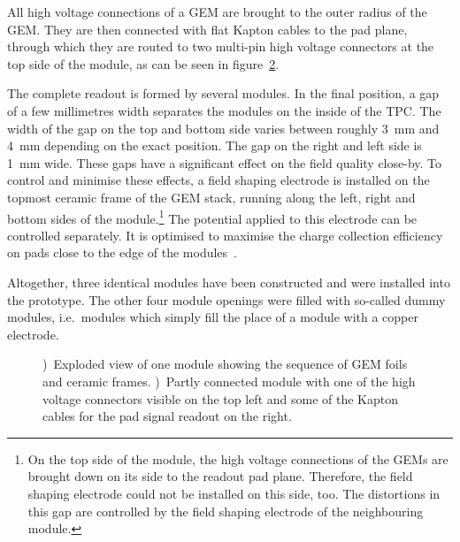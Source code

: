 \documentclass[preprint]{elsarticle}
\begin{document}
All high voltage connections of a GEM are brought to the outer radius of the GEM. They are then connected with flat Kapton cables to the pad plane, through which they are routed to two multi-pin high voltage connectors at the top side of the module, as can be seen in figure~\ref{sfig:moduleBack}.

The complete readout is formed by several modules. In the final position, a gap of a few millimetres width separates the modules on the inside of the TPC. The width of the gap on the top and bottom side varies between roughly \SI{3}{\mm} and \SI{4}{\mm} depending on the exact position. The gap on the right and left side is \SI{1}{\mm} wide. These gaps have a significant effect on the field quality close-by. To control and minimise these effects, a field shaping electrode is installed on the topmost ceramic frame of the GEM stack, running along the left, right and bottom sides of the module.\footnote{On the top side of the module, the high voltage connections of the GEMs are brought down on its side to the readout pad plane. Therefore, the field shaping electrode could not be installed on this side, too. The distortions in this gap are controlled by the field shaping electrode of the neighbouring module.} The potential applied to this electrode can be controlled separately. 
It is optimised to maximise the charge collection efficiency on pads close to the edge of the modules~\cite{ZenkerPhD}. 

Altogether, three identical modules have been constructed and were installed into the prototype. The other four module openings were filled with so-called dummy modules, i.e.\ modules which simply fill the place of a module with a copper electrode. 
 

\begin{figure}[tb]
\begin{subfigure}[b]{0.47\textwidth}
\iftoggle{blackandwhite}{\texttt{[image: figures/GemModule\_ExplosionBW.png]}}{\texttt{[image: figures/GemModule\_Explosion.pdf]}}
\caption{}
\label{sfig:moduleExp}
\end{subfigure}
\hfill
\begin{subfigure}[b]{0.47\textwidth}
\iftoggle{blackandwhite}{\texttt{[image: figures/padplane\_connectedBW.jpg]}}{\texttt{[image: figures/padplane\_connected.jpg]}}
\caption{}
\label{sfig:moduleBack}
\end{subfigure}
\caption [Readout Module GEM]{\small \protect{})~Exploded view of one module showing the sequence of GEM foils and ceramic frames. \protect{})~Partly connected module with one of the high voltage connectors visible on the top left and some of the Kapton cables for the pad signal readout on the right. }
\label{fig:moduleAssembled}
\end{figure}
\end{document}
